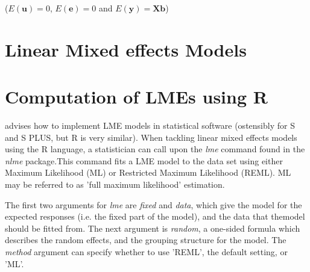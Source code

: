 \documentclass[12pt, a4paper]{report}
\theoremstyle{plain}
\theoremstyle{definition}
\theoremstyle{remark}
\begin{document}
($E(\textbf{u})=0$, $E(\textbf{e})=0 $ and $E(\textbf{y}) =
\textbf{Xb}$)

\section{Linear Mixed effects Models}










\newpage

\section{Computation of LMEs using R} \cite{PB} advises how to
implement LME models in statistical software (ostensibly for S and
S PLUS, but R is very similar). When tackling linear mixed effects
models using the R language, a statistician can call upon the
\emph{lme} command found in the \emph{nlme} package.This command
fits a LME model to the data set using either Maximum Likelihood
(ML) or Restricted Maximum Likelihood (REML). ML may be referred
to as 'full maximum likelihood' estimation.

The first two arguments for \emph{lme} are \emph{fixed} and
\emph{data}, which give the model for the expected responses (i.e.
the fixed part of the model), and the data that themodel should be
fitted from. The next argument is  \emph{random}, a one-sided
formula which describes the random effects, and the grouping
structure for the model. The  \emph{method} argument can specify
whether to use 'REML', the default setting, or 'ML'.
\end{document}
